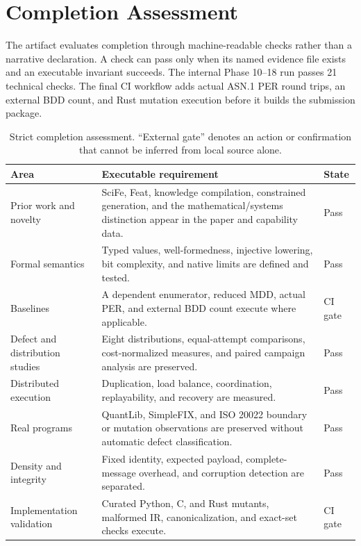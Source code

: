 \section{Completion Assessment}\label{sec:scorecard}
The artifact evaluates completion through machine-readable checks rather than a narrative declaration. A check can pass only when its named evidence file exists and an executable invariant succeeds. The internal Phase 10--18 run passes 21 technical checks. The final CI workflow adds actual ASN.1 PER round trips, an external BDD count, and Rust mutation execution before it builds the submission package.

\begin{table}[t]
\centering\small
\caption{Strict completion assessment. ``External gate'' denotes an action or confirmation that cannot be inferred from local source alone.}
\label{tab:scorecard}
\begin{tabularx}{\linewidth}{>{\raggedright\arraybackslash}p{.25\linewidth}>{\raggedright\arraybackslash}p{.55\linewidth}l}
\toprule
Area & Executable requirement & State \\
\midrule
Prior work and novelty & SciFe, Feat, knowledge compilation, constrained generation, and the mathematical/systems distinction appear in the paper and capability data. & Pass \\
Formal semantics & Typed values, well-formedness, injective lowering, bit complexity, and native limits are defined and tested. & Pass \\
Baselines & A dependent enumerator, reduced MDD, actual PER, and external BDD count execute where applicable. & CI gate \\
Defect and distribution studies & Eight distributions, equal-attempt comparisons, cost-normalized measures, and paired campaign analysis are preserved. & Pass \\
Distributed execution & Duplication, load balance, coordination, replayability, and recovery are measured. & Pass \\
Real programs & QuantLib, SimpleFIX, and ISO 20022 boundary or mutation observations are preserved without automatic defect classification. & Pass \\
Density and integrity & Fixed identity, expected payload, complete-message overhead, and corruption detection are separated. & Pass \\
Implementation validation & Curated Python, C, and Rust mutants, malformed IR, canonicalization, and exact-set checks execute. & CI gate \\

\end{tabularx}
\end{table}
